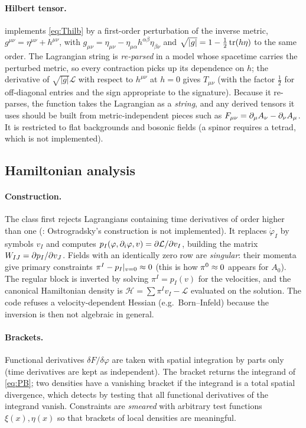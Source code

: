 \paragraph{Hilbert tensor.}  implements \cref{eq:Thilb} by a first-order perturbation of the inverse metric, $g^{\mu\nu}=\eta^{\mu\nu}+h^{\mu\nu}$, with $g_{\mu\nu}=\eta_{\mu\nu}-\eta_{\mu\alpha}h^{\alpha\beta}\eta_{\beta\nu}$ and $\sqrt{|g|}=1-\tfrac12\operatorname{tr}(h\eta)$ to the same order. The Lagrangian string is \emph{re-parsed} in a model whose spacetime carries the perturbed metric, so every contraction picks up its dependence on $h$; the derivative of $\sqrt{|g|}\mathcal L$ with respect to $h^{\mu\nu}$ at $h=0$ gives $T_{\mu\nu}$ (with the factor $\tfrac12$ for off-diagonal entries and the sign appropriate to the signature). Because it re-parses, the function takes the Lagrangian as a \emph{string}, and any derived tensors it uses should be built from metric-independent pieces such as $F_{\mu\nu}=\partial_\mu A_\nu-\partial_\nu A_\mu$. It is restricted to flat backgrounds and bosonic fields (a spinor requires a tetrad, which is not implemented).

\subsection{Hamiltonian analysis}
\label{sec:ham-impl}

\paragraph{Construction.} The  class first rejects Lagrangians containing time derivatives of order higher than one (: Ostrogradsky's construction \cite{Ostrogradsky1850,Woodard2007} is not implemented). It replaces $\dot\varphi_I$ by symbols $v_I$ and computes $p_I(\varphi,\partial_i\varphi,v)=\partial\mathcal L/\partial v_I$, building the matrix $W_{IJ}=\partial p_I/\partial v_J$. Fields with an identically zero row are \emph{singular}: their momenta give primary constraints $\pi^I-p_I|_{v=0}\approx0$ (this is how $\pi^0\approx0$ appears for $A_0$). The regular block is inverted by solving $\pi^I=p_I(v)$ for the velocities, and the canonical Hamiltonian density is $\mathcal H=\sum\pi^Iv_I-\mathcal L$ evaluated on the solution. The code refuses a velocity-dependent Hessian (e.g.\ Born--Infeld) because the inversion is then not algebraic in general.

\paragraph{Brackets.} Functional derivatives $\delta F/\delta\varphi$ are taken with spatial integration by parts only (time derivatives are kept as independent). The bracket  returns the integrand of \cref{eq:PB}; two densities have a vanishing bracket if the integrand is a total spatial divergence, which  detects by testing that all functional derivatives of the integrand vanish. Constraints are \emph{smeared} with arbitrary test functions $\xi(x),\eta(x)$ so that brackets of local densities are meaningful.

